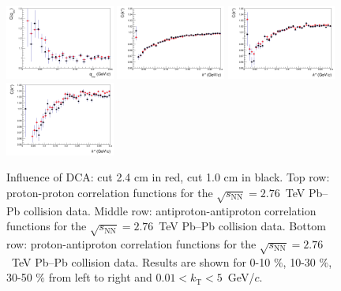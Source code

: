 \begin{figure}
  \includegraphics[width=0.32\textwidth]{cmp_dcatpconly11h_dca24_dca10_cen4/APAP}
  \includegraphics[width=0.32\textwidth]{cmp_dcatpconly11h_dca24_dca10_cen0/PAP}
  \includegraphics[width=0.32\textwidth]{cmp_dcatpconly11h_dca24_dca10_cen2/PAP}
  \includegraphics[width=0.32\textwidth]{cmp_dcatpconly11h_dca24_dca10_cen4/PAP}
  \caption{{Influence of DCA: cut 2.4 cm in red, cut 1.0 cm in black}. Top row: proton-proton correlation functions for the $\sqrt{s_{\mathrm{NN}}}=2.76$~TeV Pb--Pb collision data. Middle row: antiproton-antiproton correlation functions for the $\sqrt{s_{\mathrm{NN}}}=2.76$~TeV Pb--Pb collision data. Bottom row: proton-antiproton correlation functions for the $\sqrt{s_{\mathrm{NN}}}=2.76$~TeV Pb--Pb collision data. Results are shown for 0-10 $\%$, 10-30 $\%$,  30-50 $\%$ from left to right and $0.01 < k_{\mathrm{T}}<5$~GeV/$c$.}
  \label{cf_dca24_dca10}
\end{figure}

